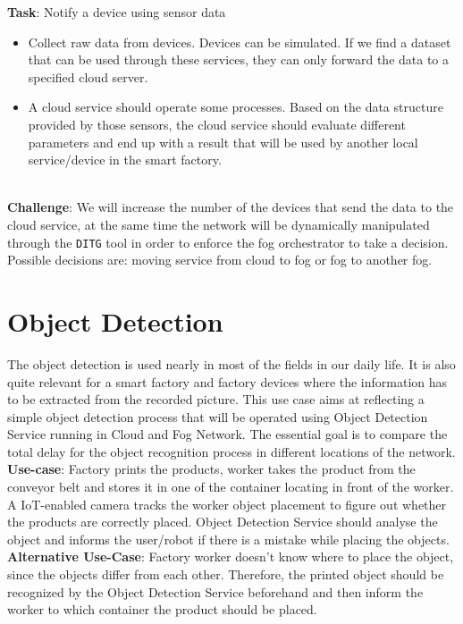 \textbf{Task}: Notify a device using sensor data
\begin{itemize}
    \item Collect raw data from devices. Devices can be simulated. If we find a dataset that can be used through these services, they can only forward the data to a specified cloud server.
    \item A cloud service should operate some processes. Based on the data structure provided by those sensors, the cloud service should evaluate different parameters and end up with a result that will be used by another local service/device in the smart factory.
\end{itemize}
\\
\textbf{Challenge}: We will increase the number of the devices that send the data to the cloud service, at the same time the network will be dynamically manipulated through the \texttt{DITG} tool in order to enforce the fog orchestrator to take a decision. Possible decisions are: moving service from cloud to fog or fog to another fog.

\section{Object Detection}
The object detection is used nearly in most of the fields in our daily life. It is also quite relevant for a smart factory and factory devices where the information has to be extracted from the recorded picture. This use case aims at reflecting a simple object detection process that will be operated using Object Detection Service running in Cloud and Fog Network. The essential goal is to compare the total delay for the object recognition process in different locations of the network.\\

\textbf{Use-case}: Factory prints the products, worker takes the product from the conveyor belt and stores it in one of the container locating in front of the worker. A IoT-enabled camera tracks the worker object placement to figure out whether the products are correctly placed. Object Detection Service should analyse the object and informs the user/robot if there is a mistake while placing the objects.\\

\textbf{Alternative Use-Case}: Factory worker doesn’t know where to place the object, since the objects differ from each other. Therefore, the printed object should be recognized by the Object Detection Service beforehand and then inform the worker to which container the product should be placed.\\

